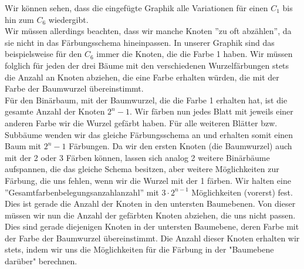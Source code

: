      Wir können sehen, dass die eingefügte Graphik alle Variationen für einen $C_1$ bis hin zum $C_6$  wiedergibt. \\
     Wir müssen allerdings beachten, dass wir manche Knoten ''zu oft abzählen'', da sie nicht in das 
     Färbungsschema hineinpassen. In unserer Graphik sind das beispielsweise für den $C_6$  immer die 
     Knoten, die die Farbe 1 haben. Wir müssen folglich für jeden der drei Bäume  mit den verschiedenen 
     Wurzelfärbungen stets die Anzahl an Knoten abziehen, die eine Farbe erhalten würden, die mit der 
     Farbe der Baumwurzel übereinstimmt.\\
     Für den Binärbaum, mit der Baumwurzel, die die Farbe 1 erhalten hat, ist die gesamte Anzahl der 
     Knoten $2^n-1$. Wir färben nun jedes Blatt mit jeweils einer anderen Farbe wir die Wurzel gefärbt 
     haben. Für alle weiteren Blätter bzw. Subbäume wenden wir das gleiche Färbungsschema an und erhalten 
     somit einen Baum mit $2^n-1$ Färbungen. Da wir den ersten Knoten (die Baumwurzel) auch mit der 2 
     oder 3 Färben können, lassen sich analog 2 weitere Binärbäume aufspannen, die das gleiche Schema 
     besitzen, aber weitere Möglichkeiten zur Färbung, die uns fehlen, wenn wir die Wurzel mit der 1 
     färben. Wir halten eine ''Gesamtfarbenbelegungsanzahlanzahl'' mit $3\cdot 2^{n-1}$ Möglichkeiten 
     (vorerst) fest. Dies ist gerade die Anzahl der Knoten in den untersten Baumebenen.
     Von dieser müssen wir nun die Anzahl der gefärbten Knoten abziehen, die uns nicht passen. Dies 
     sind gerade diejenigen Knoten in der untersten Baumebene, deren Farbe mit der Farbe der Baumwurzel 
     übereinstimmt. Die Anzahl dieser Knoten erhalten wir stets, indem wir uns die Möglichkeiten für 
     die Färbung in der "Baumebene darüber" berechnen.
     
